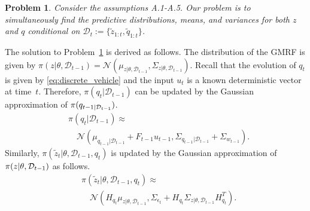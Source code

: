 \documentclass[letterpaper, 10 pt, conference]{ieeeconf}
\newtheorem{prob}[thm]{Problem} \newtheorem{lem}[thm]{Lemma}
\newcommand{\set}[1]{\{#1\}} \newcommand{\norm}[1]{\|#1\|}
\newcommand{\mc}[1]{\mathcal{#1}} \newcommand{\mb}[1]{\mathbf{#1}}
\newcommand{\N}{\mc{N}}
\newcommand{\D}[2]{\mc{D}_{#2}}
\newcommand{\q}[1]{{q_{#1}}}
\newcommand{\z}[1]{{z_{#1}}}
\begin{document}

\begin{prob}\label{prob:certain}
Consider the assumptions A.1-A.5. Our problem is to   simultaneously find the predictive distributions, means, and variances for both   $z$ and   $q$  conditional on $\D{1}{t}:=\set{\tilde{z}_{1:t},\tilde{q}_{1:t}}$.
\end{prob}




The solution to Problem~\ref{prob:certain} is derived as follows.
The distribution of the GMRF is given by $\pi \left( z|\theta ,\D{0}{t - 1} \right) = \N \left( \mu_{{z}|\theta ,\D{0}{t - 1}}, \Sigma_{{z}|\theta ,\D{0}{t - 1}} \right)$. Recall that the evolution of $q_t$ is given by \eqref{eq:discrete_vehicle} and the input $u_t$ is a known deterministic vector  at time~$t$. Therefore, 
$\pi \left( \q{t}|\D{0}{t - 1} \right)$ can be updated by the Gaussian approximation of $\pi (q_{t-1| \D_{t-1}})$.
\begin{equation}
\begin{split}
& \pi \left( \q{t}|\D{0}{t - 1} \right) \approx \\
& \quad \N\left( \mu_{{\q{t - 1}}|\D{0}{t - 1}} + F_{t-1} u_{t-1},\Sigma_{{\q{t - 1}}|\D{0}{t - 1}} + \Sigma_{w_{t-1}} \right).
\end{split}
\label{eq:prediccted_posib}
\end{equation}
Similarly, $\pi\left({\tilde{z}_{t}|\theta,\D{1}{t-1},\q{t}}\right)$ is updated by the Gaussian approximation of 
$\pi (z | \theta, \D_{t-1})$
as follows.
\begin{equation}
\begin{split}
& \pi\left({\tilde{z}_{t}|\theta,\D{1}{t-1},\q{t}}\right) \approx \\
&\quad \N \left( H_{q_t} \mu_{z| \theta,\D{1}{t-1}}, \Sigma_{\epsilon_t} + H_{q_t} \Sigma_{z| \theta,\D{1}{t-1}} H_{q_t}^T\right).
\end{split}
\label{eq:dis_yt_prd}
\end{equation}
\end{document}

